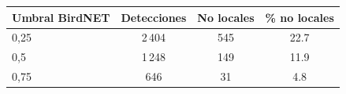 \begin{tabular}{lccc}
\toprule
Umbral BirdNET & Detecciones & No locales & \% no locales\\
\midrule
0,25 & 2\,404 & 545 & 22.7\\
0,5 & 1\,248 & 149 & 11.9\\
0,75 & 646 & 31 & 4.8\\
\bottomrule
\end{tabular}
